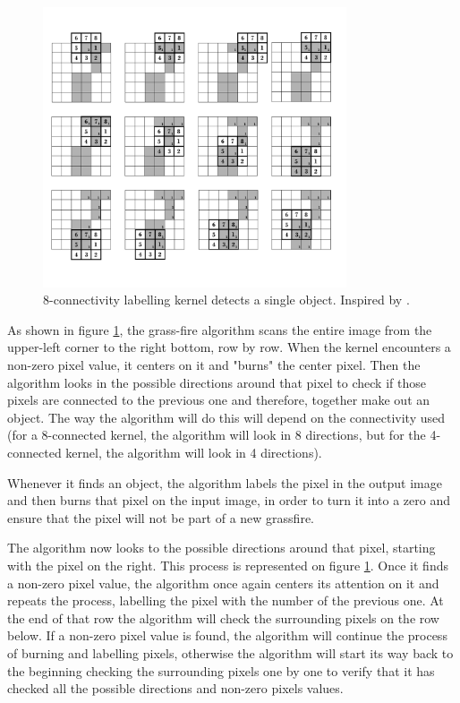\begin{figure}[htbp]
\centering
\includegraphics[width=0.8\textwidth]{Pictures/Theory/8connec_kernel.png}
\caption{8-connectivity labelling kernel detects a single object. Inspired by \citep{ip_book}.}
\label{fig:8connecK}
\end{figure}

As shown in figure \ref{fig:8connecK}, the grass-fire algorithm scans the entire image from the upper-left corner to the right bottom, row by row. When the kernel encounters a non-zero pixel value, it centers on it and "burns" the center pixel. Then the algorithm looks in the possible directions around that pixel to check if those pixels are connected to the previous one and therefore, together make out an object. The way the algorithm will do this will depend on the connectivity used (for a 8-connected kernel, the algorithm will look in 8 directions, but for the 4-connected kernel, the algorithm will look in 4 directions).

Whenever it finds an object, the algorithm labels the pixel in the output image and then burns that pixel on the input image, in order to turn it into a zero and ensure that the pixel will not be part of a new grassfire.

The algorithm now looks to the possible directions around that pixel, starting with the pixel on the right. This process is represented on figure \ref{fig:8connecK}. Once it finds a non-zero pixel value, the algorithm once again centers its attention on it and repeats the process, labelling the pixel with the number of the previous one. At the end of that row the algorithm will check the surrounding pixels on the row below. If a non-zero pixel value is found, the algorithm will continue the process of burning and labelling pixels, otherwise the algorithm will start its way back to the beginning checking the surrounding pixels one by one to verify that it has checked all the possible directions and non-zero pixels values.

